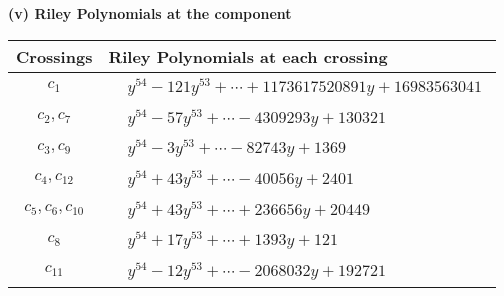 \documentclass[1p]{elsarticle_modified}
\theoremstyle{definition}
\begin{document}
\flushleft \textbf{(v) Riley Polynomials at the component}\newline \\
\begin{tabular}{m{50pt}|m{274pt}}
Crossings & \hspace{64pt}Riley Polynomials at each crossing \\
\hline $$\begin{aligned}c_{1}\end{aligned}$$&$\begin{aligned}
&y^{54}-121 y^{53}+\cdots+1173617520891 y+16983563041
\end{aligned}$\\
\hline $$\begin{aligned}c_{2},c_{7}\end{aligned}$$&$\begin{aligned}
&y^{54}-57 y^{53}+\cdots-4309293 y+130321
\end{aligned}$\\
\hline $$\begin{aligned}c_{3},c_{9}\end{aligned}$$&$\begin{aligned}
&y^{54}-3 y^{53}+\cdots-82743 y+1369
\end{aligned}$\\
\hline $$\begin{aligned}c_{4},c_{12}\end{aligned}$$&$\begin{aligned}
&y^{54}+43 y^{53}+\cdots-40056 y+2401
\end{aligned}$\\
\hline $$\begin{aligned}c_{5},c_{6},c_{10}\end{aligned}$$&$\begin{aligned}
&y^{54}+43 y^{53}+\cdots+236656 y+20449
\end{aligned}$\\
\hline $$\begin{aligned}c_{8}\end{aligned}$$&$\begin{aligned}
&y^{54}+17 y^{53}+\cdots+1393 y+121
\end{aligned}$\\
\hline $$\begin{aligned}c_{11}\end{aligned}$$&$\begin{aligned}
&y^{54}-12 y^{53}+\cdots-2068032 y+192721
\end{aligned}$\\
\hline
\end{tabular}\\~\\
\end{document}
